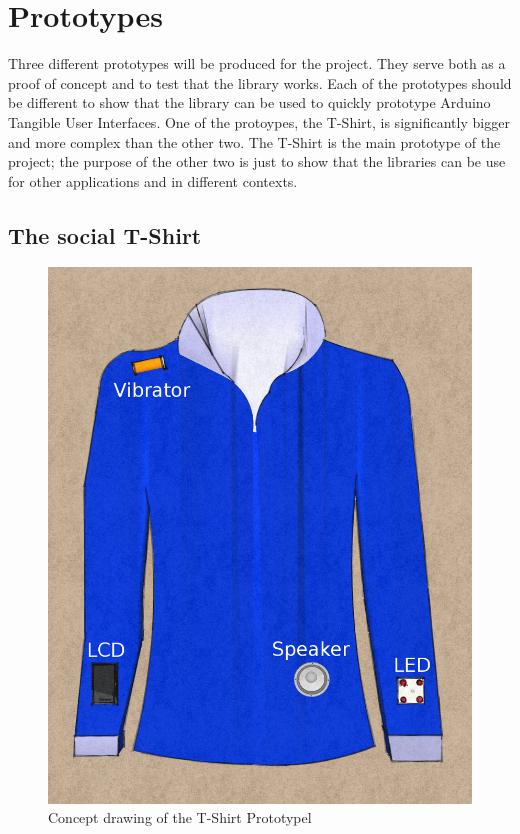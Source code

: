 \newpage
\section{Prototypes}
Three different prototypes will be produced for the project. They serve both as a proof of concept and
to test that the library works. Each of the prototypes should be different to show that the library can be
used to quickly prototype Arduino Tangible User Interfaces. One of the protoypes, the T-Shirt, is significantly
bigger and more complex than the other two. The T-Shirt is the main prototype of the project; the purpose of the other two
is just to show that the libraries can be use for other applications and in different contexts.

\subsection{The social T-Shirt}
	
\begin{figure}
\vspace{-20pt}
\begin{center}
\includegraphics[scale=0.2]{img/design-tshirtproto}
\end{center}
\vspace{-10pt}
\caption{Concept drawing of the T-Shirt Prototypel}
\label{fig:design-TShirt}
\vspace{-50pt}
\end{figure}
	
